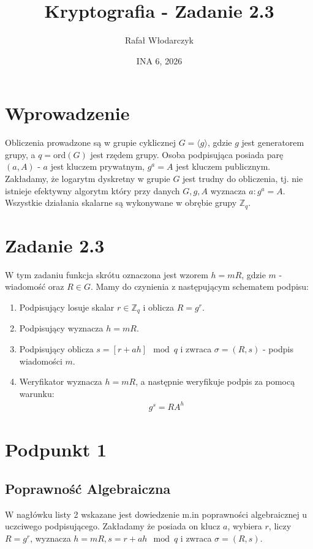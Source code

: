 \documentclass{article}
\title{Kryptografia - Zadanie 2.3}
\author{Rafał Włodarczyk}
\date{INA 6, 2026}
\numberwithin{equation}{subsection}
\begin{document}
\maketitle

\section{Wprowadzenie}

Obliczenia prowadzone są w grupie cyklicznej $G=\langle g \rangle$, 
gdzie $g$ jest generatorem grupy, a $q=\text{ord}(G)$ jest rzędem grupy. 
Osoba podpisująca posiada parę $(a, A)$ - $a$ jest kluczem prywatnym, 
$g^a=A$ jest kluczem publicznym. Zakładamy, że logarytm dyskretny w grupie $G$ jest trudny do obliczenia,
tj. nie istnieje efektywny algorytm który przy danych $G,g,A$ wyznacza $a : g^a=A$.
Wszystkie działania skalarne są wykonywane w obrębie grupy $\mathbb{Z}_q$.

\section{Zadanie 2.3}

W tym zadaniu funkcja skrótu oznaczona jest wzorem $h=mR$, gdzie $m$ - wiadomość oraz $R \in G$.
Mamy do czynienia z następującym schematem podpisu:
\begin{enumerate}
    \item Podpisujący losuje skalar $r\in \mathbb{Z}_q$ i oblicza $R=g^r$.
    \item Podpisujący wyznacza $h=mR$.
    \item Podpisujący oblicza $s = [r + ah] \mod q$ i zwraca $\sigma=(R,s)$ - podpis wiadomości $m$.
    \item Weryfikator wyznacza $h=mR$, a następnie weryfikuje podpis za pomocą warunku:
    \begin{align*}
        g^s = RA^h
    \end{align*}
\end{enumerate}

\section{Podpunkt 1}

\subsection{Poprawność Algebraiczna}

W nagłówku listy 2 wskazane jest dowiedzenie m.in poprawności algebraicznej u uczciwego podpisującego.
Zakładamy że posiada on klucz $a$, wybiera $r$, liczy $R=g^r$, wyznacza $h=mR, s = r + ah \mod q$ i zwraca $\sigma=(R,s)$.\\
\end{document}
